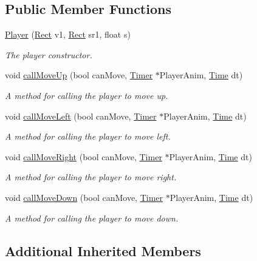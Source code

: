 \subsection*{Public Member Functions}
\begin{DoxyCompactItemize}
\item 
\hyperlink{class_player_a6cfff646e006e196fc4c125b3855fda3}{Player} (\hyperlink{struct_rect}{Rect} v1, \hyperlink{struct_rect}{Rect} sr1, float s)
\begin{DoxyCompactList}\small\item\em The player constructor. \end{DoxyCompactList}\item 
void \hyperlink{class_player_ab166e86a297493b2274851cec66b7ebc}{call\+Move\+Up} (bool can\+Move, \hyperlink{class_timer}{Timer} $\ast$Player\+Anim, \hyperlink{class_time}{Time} dt)
\begin{DoxyCompactList}\small\item\em A method for calling the player to move up. \end{DoxyCompactList}\item 
void \hyperlink{class_player_aab2dfd7d954c02ff3f39dc0de9d7b10b}{call\+Move\+Left} (bool can\+Move, \hyperlink{class_timer}{Timer} $\ast$Player\+Anim, \hyperlink{class_time}{Time} dt)
\begin{DoxyCompactList}\small\item\em A method for calling the player to move left. \end{DoxyCompactList}\item 
void \hyperlink{class_player_a6aa7f8a3b50732b365aed7e4d0685953}{call\+Move\+Right} (bool can\+Move, \hyperlink{class_timer}{Timer} $\ast$Player\+Anim, \hyperlink{class_time}{Time} dt)
\begin{DoxyCompactList}\small\item\em A method for calling the player to move right. \end{DoxyCompactList}\item 
void \hyperlink{class_player_a98cf56ce518c65de588c92464f1e6b2c}{call\+Move\+Down} (bool can\+Move, \hyperlink{class_timer}{Timer} $\ast$Player\+Anim, \hyperlink{class_time}{Time} dt)
\begin{DoxyCompactList}\small\item\em A method for calling the player to move down. \end{DoxyCompactList}\end{DoxyCompactItemize}
\subsection*{Additional Inherited Members}


